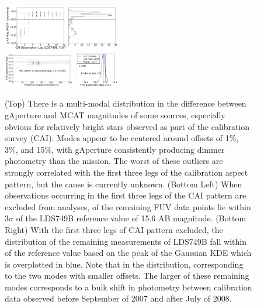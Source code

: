 \documentclass[trackchanges,preprint2]{aastex}
\begin{document}
\begin{figure}[h!]
  \includegraphics[width=0.46\textwidth,keepaspectratio]{Fig09a.pdf}\\
  \includegraphics[width=0.275\textwidth,keepaspectratio]{Fig09b.pdf}%
  \includegraphics[width=0.172\textwidth,keepaspectratio]{Fig09c.pdf}
  \caption{(Top) There is a multi-modal distribution in the difference between gAperture and MCAT magnitudes of some sources, especially obvious for relatively bright stars observed as part of the calibration survey (CAI). Modes appear to be centered around offsets of 1\%, 3\%, and 15\%, with gAperture consistently producing dimmer photometry than the mission. The worst of these outliers are strongly correlated with the first three legs of the calibration aspect pattern, but the cause is currently unknown. (Bottom Left) When observations occurring in the first three legs of the CAI pattern are excluded from analyses,  of the remaining  FUV data points lie within 3$\sigma$ of the LDS749B reference value of 15.6 AB magnitude. (Bottom Right) With the first three legs of CAI pattern excluded, the distribution of the remaining measurements of LDS749B fall within  of the reference value based on the peak of the Gaussian KDE which is overplotted in blue. Note that  in the distribution, corresponding to the two modes with smaller offsets. The larger of these remaining modes corresponds to a bulk shift in photometry between calibration data observed before September of 2007 and after July of 2008.
  \label{multimodal}}
\end{figure}
\end{document}
